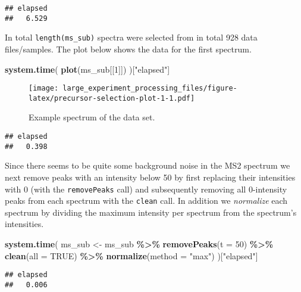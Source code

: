 \documentclass[journal=jacsat,manuscript=suppinfo]{achemso}
\newenvironment{Shaded}{\begin{snugshade}}{\end{snugshade}}
\newcommand{\DataTypeTok}[1]{\textcolor[rgb]{0.13,0.29,0.53}{#1}}
\newcommand{\DecValTok}[1]{\textcolor[rgb]{0.00,0.00,0.81}{#1}}
\newcommand{\KeywordTok}[1]{\textcolor[rgb]{0.13,0.29,0.53}{\textbf{#1}}}
\newcommand{\NormalTok}[1]{#1}
\newcommand{\OperatorTok}[1]{\textcolor[rgb]{0.81,0.36,0.00}{\textbf{#1}}}
\newcommand{\OtherTok}[1]{\textcolor[rgb]{0.56,0.35,0.01}{#1}}
\newcommand{\StringTok}[1]{\textcolor[rgb]{0.31,0.60,0.02}{#1}}
\begin{document}
\begin{verbatim}
## elapsed 
##   6.529
\end{verbatim}

In total \texttt{length(ms\_sub)} spectra were selected from in total
928 data files/samples. The plot below shows the data for the first
spectrum.

\begin{Shaded}
\begin{Highlighting}[]
\KeywordTok{system.time}\NormalTok{(}
    \KeywordTok{plot}\NormalTok{(ms\_sub[[}\DecValTok{1}\NormalTok{]])}
\NormalTok{)[}\StringTok{"elapsed"}\NormalTok{]}
\end{Highlighting}
\end{Shaded}

\begin{figure}
\centering
\texttt{[image: large\_experiment\_processing\_files/figure-latex/precursor-selection-plot-1-1.pdf]}
\caption{Example spectrum of the data set.}
\end{figure}

\begin{verbatim}
## elapsed 
##   0.398
\end{verbatim}

Since there seems to be quite some background noise in the MS2 spectrum
we next remove peaks with an intensity below 50 by first replacing their
intensities with 0 (with the \texttt{removePeaks} call) and subsequently
removing all 0-intensity peaks from each spectrum with the
\texttt{clean} call. In addition we \emph{normalize} each spectrum by
dividing the maximum intensity per spectrum from the spectrum's
intensities.

\begin{Shaded}
\begin{Highlighting}[]
\KeywordTok{system.time}\NormalTok{(}
\NormalTok{    ms\_sub \textless{}{-}}\StringTok{ }\NormalTok{ms\_sub }\OperatorTok{\%\textgreater{}\%}
\StringTok{        }\KeywordTok{removePeaks}\NormalTok{(}\DataTypeTok{t =} \DecValTok{50}\NormalTok{) }\OperatorTok{\%\textgreater{}\%}
\StringTok{        }\KeywordTok{clean}\NormalTok{(}\DataTypeTok{all =} \OtherTok{TRUE}\NormalTok{) }\OperatorTok{\%\textgreater{}\%}
\StringTok{        }\KeywordTok{normalize}\NormalTok{(}\DataTypeTok{method =} \StringTok{"max"}\NormalTok{)}
\NormalTok{)[}\StringTok{"elapsed"}\NormalTok{]}
\end{Highlighting}
\end{Shaded}

\begin{verbatim}
## elapsed 
##   0.006
\end{verbatim}
\end{document}
